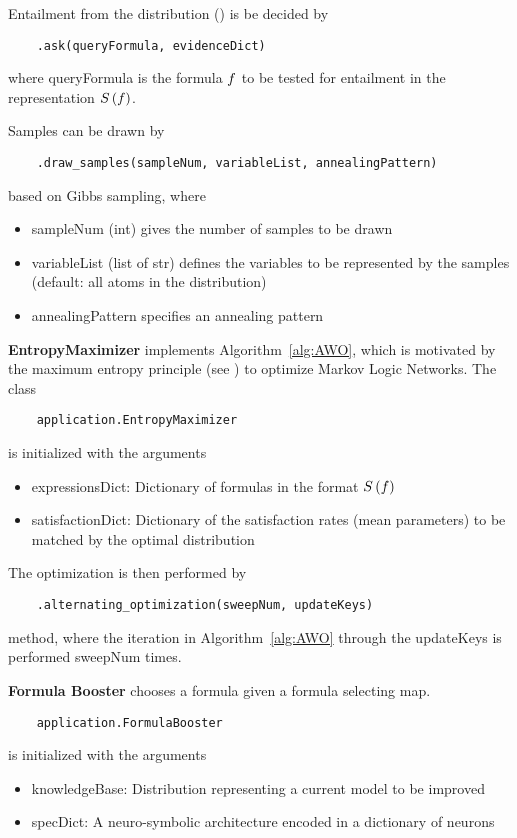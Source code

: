 Entailment from the distribution () is be decided by
\begin{lstlisting}
	.ask(queryFormula, evidenceDict)
\end{lstlisting}
where queryFormula is the formula $f$ to be tested for entailment in the representation $S\left(f\right)$.

Samples can be drawn by
\begin{lstlisting}
	.draw_samples(sampleNum, variableList, annealingPattern)
\end{lstlisting}
based on Gibbs sampling, where
\begin{itemize}
    \item sampleNum (int) gives the number of samples to be drawn
    \item variableList (list of str) defines the variables to be represented by the samples (default: all atoms in the distribution)
    \item annealingPattern specifies an annealing pattern
\end{itemize}



\textbf{EntropyMaximizer} implements Algorithm~\ref{alg:AWO}, which is motivated by the maximum entropy principle (see ) to optimize Markov Logic Networks.
The class
\begin{lstlisting}
	application.EntropyMaximizer
\end{lstlisting}
is initialized with the arguments
\begin{itemize}
    \item expressionsDict: Dictionary of formulas in the format $S\left(f\right)$
    \item satisfactionDict: Dictionary of the satisfaction rates (mean parameters) to be matched by the optimal distribution
\end{itemize}
The optimization is then performed by
\begin{lstlisting}
	.alternating_optimization(sweepNum, updateKeys)
\end{lstlisting}
method, where the iteration in Algorithm~\ref{alg:AWO} through the updateKeys is performed sweepNum times.


\textbf{Formula Booster} chooses a formula given a formula selecting map.
\begin{lstlisting}
	application.FormulaBooster
\end{lstlisting}
is initialized with the arguments
\begin{itemize}
    \item knowledgeBase: Distribution representing a current model to be improved
    \item specDict: A neuro-symbolic architecture encoded in a dictionary of neurons
\end{itemize}


